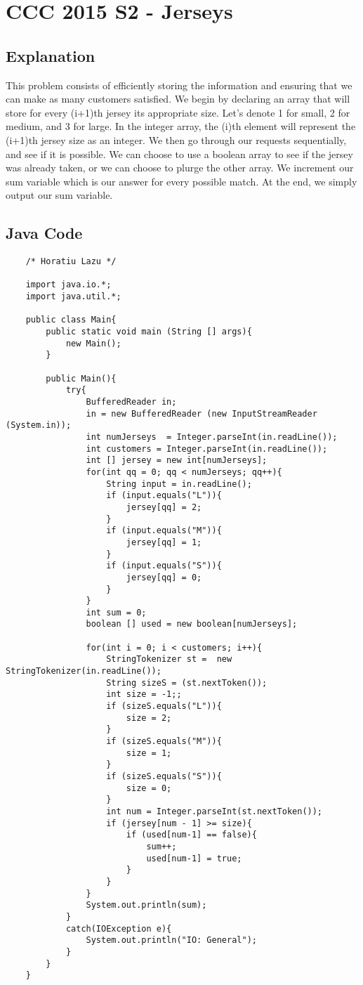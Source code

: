 \documentclass[52pt]{article}
\begin{document}
	\section {CCC 2015 S2 - Jerseys}
	\subsection {Explanation}
	This problem consists of efficiently storing the information and ensuring that we can make as many customers satisfied. We begin by declaring an array that will store for every (i+1)th jersey its appropriate size. Let's denote 1 for small, 2 for medium, and 3 for large. In the integer array, the (i)th element will represent the (i+1)th jersey size as an integer. We then go through our requests sequentially, and see if it is possible. We can choose to use a boolean array to see if the jersey was already taken, or we can choose to plurge the other array. We increment our sum variable which is our answer for every possible match. At the end, we simply output our sum variable.
	
	\subsection {Java Code}
	\begin{lstlisting}
	/* Horatiu Lazu */

	import java.io.*;
	import java.util.*;

	public class Main{
		public static void main (String [] args){
			new Main();
		}
		
		public Main(){
			try{
				BufferedReader in;
				in = new BufferedReader (new InputStreamReader (System.in));
				int numJerseys  = Integer.parseInt(in.readLine());
				int customers = Integer.parseInt(in.readLine());
				int [] jersey = new int[numJerseys];
				for(int qq = 0; qq < numJerseys; qq++){
					String input = in.readLine();
					if (input.equals("L")){
						jersey[qq] = 2;
					}
					if (input.equals("M")){
						jersey[qq] = 1;
					}
					if (input.equals("S")){
						jersey[qq] = 0;
					}
				}
				int sum = 0;
				boolean [] used = new boolean[numJerseys];
				
				for(int i = 0; i < customers; i++){
					StringTokenizer st =  new StringTokenizer(in.readLine());
					String sizeS = (st.nextToken());
					int size = -1;;
					if (sizeS.equals("L")){
						size = 2;
					}
					if (sizeS.equals("M")){
						size = 1;
					}
					if (sizeS.equals("S")){
						size = 0;
					}
					int num = Integer.parseInt(st.nextToken());
					if (jersey[num - 1] >= size){
						if (used[num-1] == false){
							sum++;
							used[num-1] = true;
						}
					}                          
				}
				System.out.println(sum);
			}
			catch(IOException e){
				System.out.println("IO: General");
			}
		}
	}
	\end{lstlisting}
	\newpage
\end{document}
